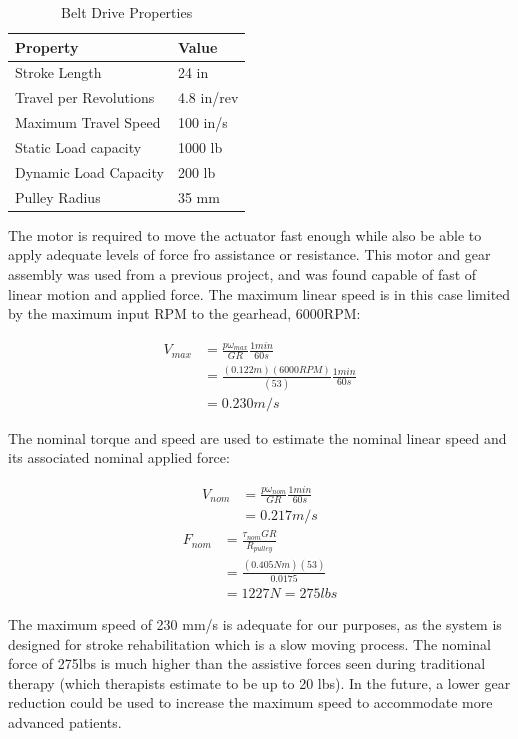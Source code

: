 \documentclass[12pt]{report}
\begin{document}
	
	\begin{table}[h]
	\centering
	\caption{Belt Drive Properties}	
	\begin{tabular}{|l|l|}
		\hline
		\textbf{Property} & \textbf{Value}  \\ \hline
		Stroke Length & 24 in  \\ \hline
 		Travel per Revolutions & 4.8 in/rev  \\ \hline
 		Maximum Travel Speed & 100 in/s  \\ \hline
 		Static Load capacity & 1000 lb  \\ \hline
 		Dynamic Load Capacity & 200 lb  \\ \hline
 		Pulley Radius & 35 mm  \\ \hline
		\end{tabular}
	\label{tab:belt}
	\end{table}
	

	
	The motor is required to move the actuator fast enough while also be able to apply adequate levels of force fro assistance or resistance. This motor and gear assembly was used from a previous project, and was found capable of fast of linear motion and applied force. The maximum linear speed is in this case limited by the maximum input RPM to the gearhead, 6000RPM: 
	
	\begin{align*}
		V_{max} &= \frac{p\omega _{max}}{GR} \frac{1min}{60s} \\
		&= \frac{(0.122m)(6000 RPM)}{(53)} \frac{1min}{60s} \\
		&= 0.230 m/s
	\end{align*}
	
	The nominal torque and speed are used to estimate the nominal linear speed and its associated nominal applied force:
	
	\begin{align*}
		V_{nom} &= \frac{p\omega _{nom}}{GR} \frac{1min}{60s} \\
		&= 0.217 m/s
	\end{align*}
	\begin{align*}
		F_{nom} &= \frac{\tau _{nom}GR}{R_{pulley}} \\
		&= \frac{(0.405Nm)(53)}{0.0175} \\
		&= 1227N = 275 lbs
	\end{align*}

The maximum speed of 230 mm/s is adequate for our purposes, as the system is designed for stroke rehabilitation which is a slow moving process. The nominal force of 275lbs is much higher than the assistive forces seen during traditional therapy (which therapists estimate to be up to 20 lbs). In the future, a lower gear reduction could be used to increase the maximum speed to accommodate more advanced patients.
\end{document}
